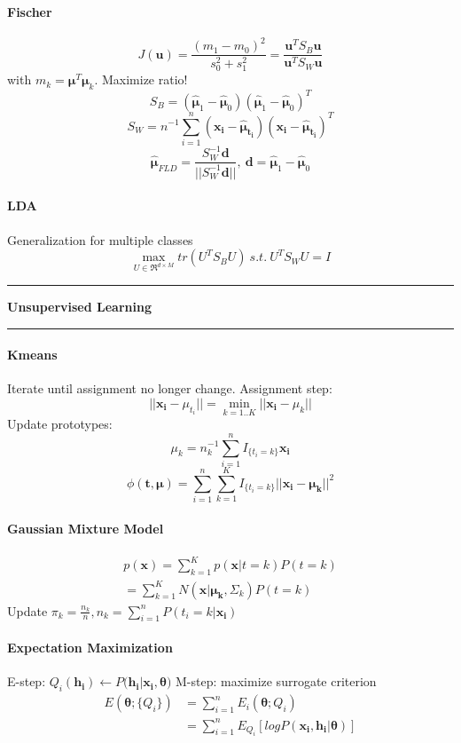 \documentclass[7pt]{scrartcl}
\newlength{\secskip}
\renewcommand{\section}[1]{
  \vspace{\secskip}
  \hrule\vspace{.3em}
  \textbf{#1}
  \vspace{.3em}
  \hrule
  \vspace{\secskip}
}
\renewcommand{\vec}{\mathbf}
\begin{document}
\begin{multicols}{4}
\paragraph{Fischer}
\[J(\vec{u}) = \frac{(m_1 - m_0)^2}{s_0^2 + s_1^2} = \frac{\vec{u}^T S_B \vec{u}}{\vec{u}^T S_W \vec{u}}\]
with $m_k = \vec{\mu}^T \vec{\mu}_k$. Maximize ratio!
\[S_B = (\hat{\vec{\mu}}_1 -\hat{\vec{\mu}}_0)(\hat{\vec{\mu}}_1 -\hat{\vec{\mu}}_0)^T\]
\[S_W = n^{-1} \sum_{i=1}^n(\vec{x_i} - \vec{\hat{\mu}_{t_i}})(\vec{x_i} - \vec{\hat{\mu}_{t_i}})^T\]
\[\vec{\hat{\mu}}_{FLD} = \frac{S_W^{-1} \vec{d}}{||S_W^{-1} \vec{d}||}, ~ \vec{d} = \hat{\vec{\mu}}_1 -\hat{\vec{\mu}}_0\]
\paragraph{LDA}
Generalization for multiple classes
\[\max_{U \in \Re^{d \times M}} tr(U^T S_B U) ~s.t.~ U^T S_WU = I\]

\section{Unsupervised Learning}
\paragraph{Kmeans}
Iterate until assignment no longer change. Assignment step: \\
\[||\vec{x_i} - \mu_{t_i}|| = \min_{k=1..K} || \vec{x_i} - \mu_{k}||\]
Update prototypes: \\
\[\mu_k = n_k^{-1} \sum_{i=1}^n I_{\{t_i=k\}}\vec{x_i}\]
\[\phi(\vec{t,\mu}) = \sum_{i=1}^n\sum_{k=1}^K I_{\{t_i=k\}} || \vec{x_i} - \vec{\mu_k} || ^2\]
\paragraph{Gaussian Mixture Model}
\begin{align*}
p(\vec{x}) = \sum_{k=1}^K p(\vec{x}|t=k) P(t=k) \\
=  \sum_{k=1}^K N(\vec{x}|\vec{\mu_k},\Sigma_k)P(t=k)
\end{align*}
Update $\pi_k = \frac{n_k}{n}, n_k = \sum_{i=1}^nP(t_i=k|\vec{x_i})$

\paragraph{Expectation Maximization}
E-step: $Q_i(\vec{h_i}) \leftarrow P(\vec{h_i}|\vec{x_i},\vec{\theta)}$
M-step: maximize surrogate criterion
\begin{align*}
E(\vec{\theta};\{Q_i\}) &= \sum_{i=1}^n E_i(\vec{\theta};Q_i) \\&= \sum_{i=1}^n E_{Q_i} [logP(\vec{x_i},\vec{h_i}|\vec{\theta})]
\end{align*}


\end{multicols}
\end{document}
